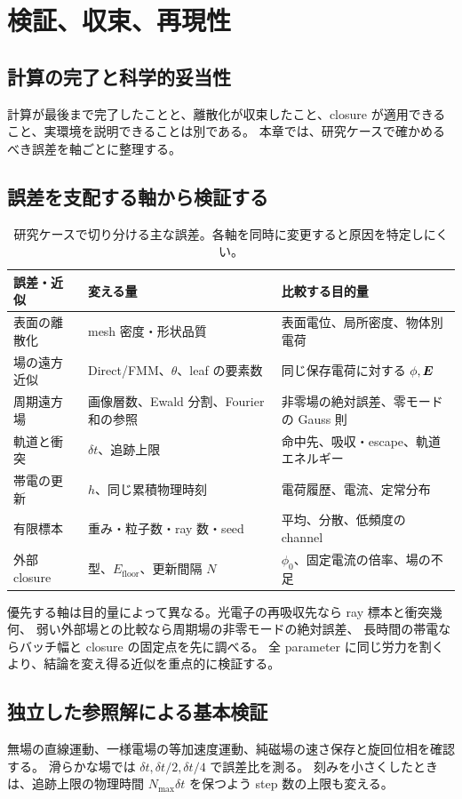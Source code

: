 \chapter{検証、収束、再現性}
\label{ch:validation}

\section{計算の完了と科学的妥当性}
計算が最後まで完了したことと、離散化が収束したこと、closure が適用できること、実環境を説明できることは別である。
本章では、研究ケースで確かめるべき誤差を軸ごとに整理する。

\section{誤差を支配する軸から検証する}
\begin{table}[htbp]
\centering\small
\begin{tabularx}{\textwidth}{p{25mm}YY}
\toprule
誤差・近似 & 変える量 & 比較する目的量 \\
\midrule
表面の離散化 & mesh 密度・形状品質 & 表面電位、局所密度、物体別電荷 \\
場の遠方近似 & Direct/FMM、$\theta$、leaf の要素数 & 同じ保存電荷に対する $\phi,\bm{E}$ \\
周期遠方場 & 画像層数、Ewald 分割、Fourier 和の参照 & 非零場の絶対誤差、零モードの Gauss 則 \\
軌道と衝突 & $\delta t$、追跡上限 & 命中先、吸収・escape、軌道エネルギー \\
帯電の更新 & $h$、同じ累積物理時刻 & 電荷履歴、電流、定常分布 \\
有限標本 & 重み・粒子数・ray 数・seed & 平均、分散、低頻度の channel \\
外部 closure & 型、$E_{\mathrm{floor}}$、更新間隔 $N$ & $\phi_0$、固定電流の倍率、場の不足 \\
\bottomrule
\end{tabularx}
\caption{研究ケースで切り分ける主な誤差。各軸を同時に変更すると原因を特定しにくい。}
\end{table}

優先する軸は目的量によって異なる。光電子の再吸収先なら ray 標本と衝突幾何、
弱い外部場との比較なら周期場の非零モードの絶対誤差、
長時間の帯電ならバッチ幅と closure の固定点を先に調べる。
全 parameter に同じ労力を割くより、結論を変え得る近似を重点的に検証する。

\section{独立した参照解による基本検証}
無場の直線運動、一様電場の等加速度運動、純磁場の速さ保存と旋回位相を確認する。
滑らかな場では $\delta t,\delta t/2,\delta t/4$ で誤差比を測る。
刻みを小さくしたときは、追跡上限の物理時間 $N_{\max}\delta t$ を保つよう step 数の上限も変える。

